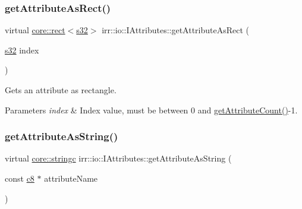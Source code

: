 \subsubsection{\texorpdfstring{get\+Attribute\+As\+Rect()}{getAttributeAsRect()}\hspace{0.1cm}{\footnotesize\ttfamily [4/4]}}
{\footnotesize\ttfamily virtual \hyperlink{classirr_1_1core_1_1rect}{core\+::rect}$<$\hyperlink{namespaceirr_ac66849b7a6ed16e30ebede579f9b47c6}{s32}$>$ irr\+::io\+::\+I\+Attributes\+::get\+Attribute\+As\+Rect (\begin{DoxyParamCaption}\item[{\hyperlink{namespaceirr_ac66849b7a6ed16e30ebede579f9b47c6}{s32}}]{index }\end{DoxyParamCaption})\hspace{0.3cm}{\ttfamily [pure virtual]}}



Gets an attribute as rectangle. 


\begin{DoxyParams}{Parameters}
{\em index} & Index value, must be between 0 and \hyperlink{classirr_1_1io_1_1IAttributes_a796bdd9440ee7ba0b6742a90a82870b6}{get\+Attribute\+Count()}-\/1. \\
\hline
\end{DoxyParams}
\mbox{\label{classirr_1_1io_1_1IAttributes_a60f395fd008a70cc0531fa038c81f0ea}} 
\subsubsection{\texorpdfstring{get\+Attribute\+As\+String()}{getAttributeAsString()}\hspace{0.1cm}{\footnotesize\ttfamily [1/6]}}
{\footnotesize\ttfamily virtual \hyperlink{namespaceirr_1_1core_ab26a0e0359206b5a694f35c37c829d7f}{core\+::stringc} irr\+::io\+::\+I\+Attributes\+::get\+Attribute\+As\+String (\begin{DoxyParamCaption}\item[{const \hyperlink{namespaceirr_a9395eaea339bcb546b319e9c96bf7410}{c8} $\ast$}]{attribute\+Name }\end{DoxyParamCaption})\hspace{0.3cm}{\ttfamily [pure virtual]}}



